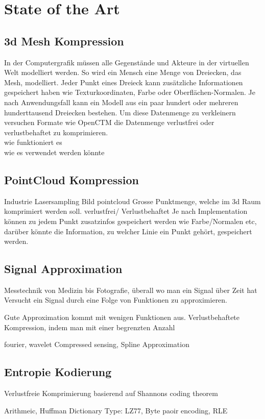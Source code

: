 \section{State of the Art}

\subsection{3d Mesh Kompression}
In der Computergrafik müssen alle Gegenstände und Akteure in der virtuellen Welt modelliert werden. So wird ein Mensch eine Menge von Dreiecken, das Mesh, modelliert. Jeder Punkt eines Dreieck kann zusätzliche Informationen gespeichert haben wie Texturkoordinaten, Farbe oder Oberflächen-Normalen. Je nach Anwendungsfall kann ein Modell aus ein paar hundert oder mehreren hunderttausend Dreiecken bestehen. Um diese Datenmenge zu verkleinern versuchen Formate wie OpenCTM \cite{website:openctm} die Datenmenge verlustfrei oder verlustbehaftet zu komprimieren.\\[\baselineskip]
wie funktioniert es\\
[\baselineskip]

wie es verwendet werden könnte

\subsection{PointCloud Kompression}
Industrie Lasersampling
Bild pointcloud
Grosse Punktmenge, welche im 3d Raum komprimiert werden soll.
verlustfrei/ Verlustbehaftet
Je nach Implementation können zu jedem Punkt zusatzinfos gespeichert werden wie Farbe/Normalen etc, darüber könnte die Information, zu welcher Linie ein Punkt gehört, gespeichert werden.

\subsection{Signal Approximation}
Messtechnik von Medizin bis Fotografie, überall wo man ein Signal über Zeit hat
Versucht ein Signal durch eine Folge von Funktionen zu approximieren.

Gute Approximation kommt mit wenigen Funktionen aus.
Verlustbehaftete Kompression, indem man mit einer begrenzten Anzahl

fourier, wavelet Compressed sensing, Spline Approximation

\subsection{Entropie Kodierung}
Verlustfreie Komprimierung basierend auf Shannons coding theorem

 Arithmeic, Huffman
Dictionary Type: LZ77, Byte paoir encoding, RLE
